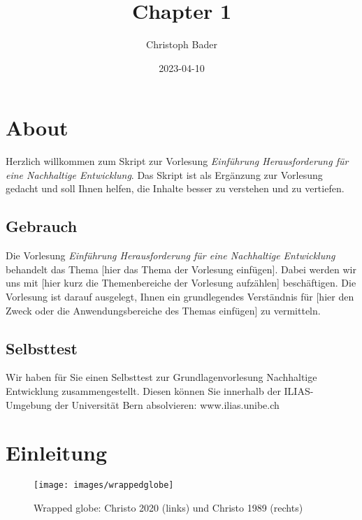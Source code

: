 \documentclass[
]{book}
\title{Chapter 1}
\author{Christoph Bader}
\date{2023-04-10}
\begin{document}
\maketitle

{
\setcounter{tocdepth}{1}
\tableofcontents
}
\hypertarget{about}{%
\chapter{About}\label{about}}

Herzlich willkommen zum Skript zur Vorlesung \emph{Einführung Herausforderung für eine Nachhaltige Entwicklung}. Das Skript ist als Ergänzung zur Vorlesung gedacht und soll Ihnen helfen, die Inhalte besser zu verstehen und zu vertiefen.

\hypertarget{gebrauch}{%
\section{Gebrauch}\label{gebrauch}}

Die Vorlesung \emph{Einführung Herausforderung für eine Nachhaltige Entwicklung} behandelt das Thema {[}hier das Thema der Vorlesung einfügen{]}. Dabei werden wir uns mit {[}hier kurz die Themenbereiche der Vorlesung aufzählen{]} beschäftigen. Die Vorlesung ist darauf ausgelegt, Ihnen ein grundlegendes Verständnis für {[}hier den Zweck oder die Anwendungsbereiche des Themas einfügen{]} zu vermitteln.

\hypertarget{selbsttest}{%
\section{Selbsttest}\label{selbsttest}}

Wir haben für Sie einen Selbsttest zur Grundlagenvorlesung Nachhaltige Entwicklung zusammengestellt. Diesen können Sie innerhalb der ILIAS-Umgebung der Universität Bern absolvieren:
www.ilias.unibe.ch

\hypertarget{einleitung}{%
\chapter{Einleitung}\label{einleitung}}

\begin{figure}

{\centering \texttt{[image: images/wrappedglobe]} 

}

\caption{Wrapped globe: Christo 2020 (links) und Christo 1989 (rechts)}\label{fig:wrappedglobe}
\end{figure}
\end{document}
